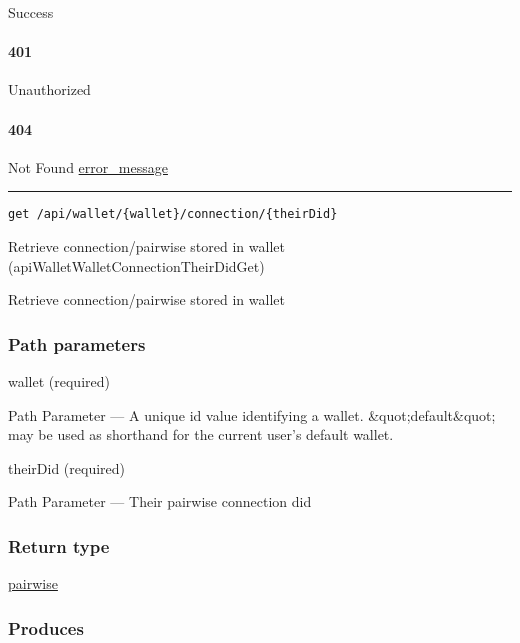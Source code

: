 Success

\hypertarget{section-617}{%
\paragraph{401}\label{section-617}}

Unauthorized \protect\hyperlink{}{}

\hypertarget{section-618}{%
\paragraph{404}\label{section-618}}

Not Found \protect\hyperlink{error_message}{error\_message}

\begin{center}\rule{0.5\linewidth}{\linethickness}\end{center}

\protect\hypertarget{apiWalletWalletConnectionTheirDidGet}{}{}

\begin{verbatim}
get /api/wallet/{wallet}/connection/{theirDid}
\end{verbatim}

Retrieve connection/pairwise stored in wallet
({apiWalletWalletConnectionTheirDidGet})

Retrieve connection/pairwise stored in wallet

\hypertarget{path-parameters-105}{%
\subsubsection{Path parameters}\label{path-parameters-105}}

wallet (required)

{Path Parameter} --- A unique id value identifying a wallet.
\&quot;default\&quot; may be used as shorthand for the current user's
default wallet.

theirDid (required)

{Path Parameter} --- Their pairwise connection did

\hypertarget{return-type-147}{%
\subsubsection{Return type}\label{return-type-147}}

\protect\hyperlink{pairwise}{pairwise}

\hypertarget{produces-186}{%
\subsubsection{Produces}\label{produces-186}}

